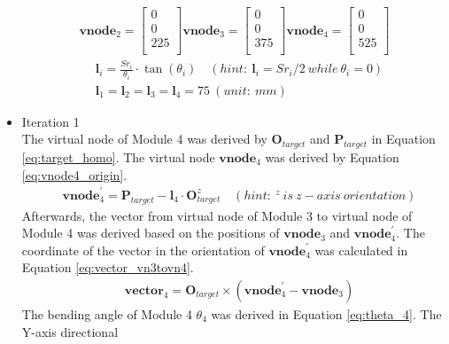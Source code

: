 \begin{itemize}
\begin{align}
        \textbf{vnode}_{2} = \begin{bmatrix} 0 \\ 0 \\ 225 \\ \end{bmatrix} 
        \textbf{vnode}_{3} = \begin{bmatrix} 0 \\ 0 \\ 375 \\ \end{bmatrix} 
        \textbf{vnode}_{4} = \begin{bmatrix} 0 \\ 0 \\ 525 \\ \end{bmatrix} 
        \label{eq:virtual_node_initial} 
    \end{align}
    \begin{align}
        &\textbf{l}_{i} = \frac{Sr_i}{\theta_i}\cdot \tan(\theta_i)
        \quad (hint: \ \textbf{l}_{i} = {Sr}_i/2 \ while \ \theta_i = 0) \label{eq:virtual_length}\\
        &\textbf{l}_{1} = \textbf{l}_{2} = \textbf{l}_{3} = \textbf{l}_{4} = 75 \ (unit: \ mm) \nonumber
    \end{align}
    \item Iteration 1 \\ %
    The virtual node of Module 4 was derived by $\textbf{O}_{target}$ and $\textbf{P}_{target}$ in Equation 
    \ref{eq:target_homo}. The virtual node $\textbf{vnode}_{4}$ was derived by Equation \ref{eq:vnode4_origin}.
    \begin{align}
        &\textbf{vnode}_{4}^{'} = \textbf{P}_{target} - \textbf{l}_{4} \cdot \textbf{O}_{target}^{z} \quad 
        (hint: \ ^{z} \ is \ z-axis \ orientation)
        \label{eq:vnode4_origin}
    \end{align}
    Afterwards, the vector from virtual node of Module 3 to virtual node of Module 4 was derived based on the 
    positions of $\textbf{vnode}_{3}$ and $\textbf{vnode}_{4}^{'}$. The coordinate of the vector in the orientation 
    of $\textbf{vnode}_{4}^{'}$ was calculated in Equation \ref{eq:vector_vn3tovn4}. 
    \begin{align}
        &\textbf{vector}_{4} = \textbf{O}_{target} \times (\textbf{vnode}_{4}^{'} - \textbf{vnode}_{3}) 
        \label{eq:vector_vn3tovn4} 
    \end{align}
    The bending angle of Module 4 $\theta_4$ was derived in Equation \ref{eq:theta_4}. The Y-axis directional 

\end{itemize}
